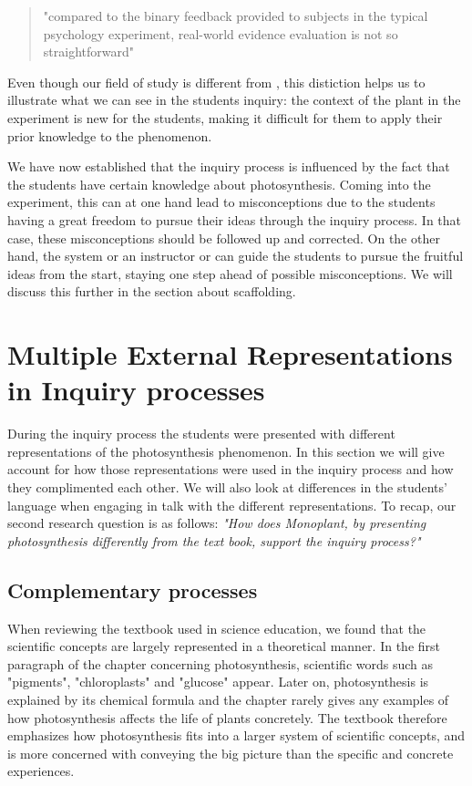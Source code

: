 \begin{quote}"compared to the binary feedback provided to subjects in the typical psychology experiment, real-world evidence evaluation is not so straightforward" \citetext{\citet[p. 114]{klahr1993heuristics}, referenced in \citealp{de1998scientific}}
\end{quote}

Even though our field of study is different from \citeauthor{klahr1993heuristics}, this distiction helps us to illustrate what we can see in the students inquiry: the context of the plant in the experiment is new for the students, making it difficult for them to apply their prior knowledge to the phenomenon. 

We have now established that the inquiry process is influenced by the fact that the students have certain knowledge about photosynthesis. Coming into the experiment, this can at one hand lead to misconceptions due to the students having a great freedom to pursue their ideas through the inquiry process. In that case, these misconceptions should be followed up and corrected. On the other hand, the system or an instructor or can guide the students to pursue the fruitful ideas from the start, staying one step ahead of possible misconceptions. We will discuss this further in the section about scaffolding.



\section{Multiple External Representations in Inquiry processes}
During the inquiry process the students were presented with different representations of the photosynthesis phenomenon. In this section we will give account for how those representations were used in the inquiry process and how they complimented each other. We will also look at differences in the students' language when engaging in talk with the different representations. To recap, our second research question is as follows: \emph{"How does Monoplant, by presenting photosynthesis differently from the text book, support the inquiry process?"}

\subsection{Complementary processes}
When reviewing the textbook used in science education, we found that the scientific concepts are largely represented in a theoretical manner. In the first paragraph of the chapter concerning photosynthesis, scientific words such as "pigments", "chloroplasts" and "glucose" appear. Later on, photosynthesis is explained by its chemical formula and the chapter rarely gives any examples of how photosynthesis affects the life of plants concretely. The textbook therefore emphasizes how photosynthesis fits into a larger system of scientific concepts, and is more concerned with conveying the big picture than the specific and concrete experiences. 

